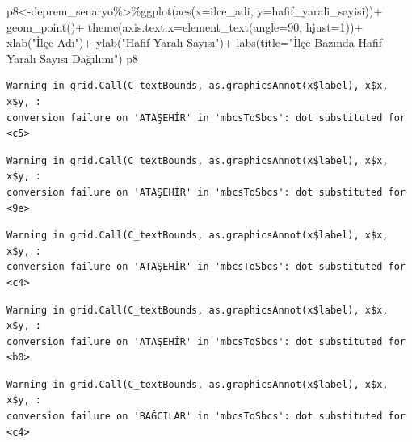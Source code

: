 \documentclass[
  11pt,
  a4paper,
  DIV=11,
  numbers=noendperiod]{scrartcl}
\newenvironment{Shaded}{\begin{snugshade}}{\end{snugshade}}
\newcommand{\AttributeTok}[1]{\textcolor[rgb]{0.40,0.45,0.13}{#1}}
\newcommand{\DecValTok}[1]{\textcolor[rgb]{0.68,0.00,0.00}{#1}}
\newcommand{\FunctionTok}[1]{\textcolor[rgb]{0.28,0.35,0.67}{#1}}
\newcommand{\NormalTok}[1]{\textcolor[rgb]{0.00,0.23,0.31}{#1}}
\newcommand{\OtherTok}[1]{\textcolor[rgb]{0.00,0.23,0.31}{#1}}
\newcommand{\SpecialCharTok}[1]{\textcolor[rgb]{0.37,0.37,0.37}{#1}}
\newcommand{\StringTok}[1]{\textcolor[rgb]{0.13,0.47,0.30}{#1}}
\begin{document}
\begin{Shaded}
\begin{Highlighting}[]
\NormalTok{p8}\OtherTok{\textless{}{-}}\NormalTok{deprem\_senaryo}\SpecialCharTok{\%\textgreater{}\%}\FunctionTok{ggplot}\NormalTok{(}\FunctionTok{aes}\NormalTok{(}\AttributeTok{x=}\NormalTok{ilce\_adi, }\AttributeTok{y=}\NormalTok{hafif\_yarali\_sayisi))}\SpecialCharTok{+}
  \FunctionTok{geom\_point}\NormalTok{()}\SpecialCharTok{+}
  \FunctionTok{theme}\NormalTok{(}\AttributeTok{axis.text.x=}\FunctionTok{element\_text}\NormalTok{(}\AttributeTok{angle=}\DecValTok{90}\NormalTok{, }\AttributeTok{hjust=}\DecValTok{1}\NormalTok{))}\SpecialCharTok{+}
  \FunctionTok{xlab}\NormalTok{(}\StringTok{"İlçe Adı"}\NormalTok{)}\SpecialCharTok{+}
  \FunctionTok{ylab}\NormalTok{(}\StringTok{"Hafif Yaralı Sayısı"}\NormalTok{)}\SpecialCharTok{+}
  \FunctionTok{labs}\NormalTok{(}\AttributeTok{title=}\StringTok{"İlçe Bazında Hafif Yaralı Sayısı Dağılımı"}\NormalTok{)}
\NormalTok{p8}
\end{Highlighting}
\end{Shaded}

\begin{verbatim}
Warning in grid.Call(C_textBounds, as.graphicsAnnot(x$label), x$x, x$y, :
conversion failure on 'ATAŞEHİR' in 'mbcsToSbcs': dot substituted for <c5>
\end{verbatim}

\begin{verbatim}
Warning in grid.Call(C_textBounds, as.graphicsAnnot(x$label), x$x, x$y, :
conversion failure on 'ATAŞEHİR' in 'mbcsToSbcs': dot substituted for <9e>
\end{verbatim}

\begin{verbatim}
Warning in grid.Call(C_textBounds, as.graphicsAnnot(x$label), x$x, x$y, :
conversion failure on 'ATAŞEHİR' in 'mbcsToSbcs': dot substituted for <c4>
\end{verbatim}

\begin{verbatim}
Warning in grid.Call(C_textBounds, as.graphicsAnnot(x$label), x$x, x$y, :
conversion failure on 'ATAŞEHİR' in 'mbcsToSbcs': dot substituted for <b0>
\end{verbatim}

\begin{verbatim}
Warning in grid.Call(C_textBounds, as.graphicsAnnot(x$label), x$x, x$y, :
conversion failure on 'BAĞCILAR' in 'mbcsToSbcs': dot substituted for <c4>
\end{verbatim}
\end{document}
